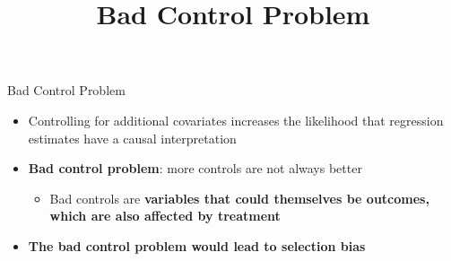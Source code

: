 \documentclass[dvipsnames,hyperref={pdfpagelabels=false}]{beamer}
\begin{document}
\title[]  
{Bad Control Problem}


\author 
{}

\institute{}






\date
{}


\begin{frame}{}
	\titlepage
\end{frame}









\begin{frame}{Bad Control Problem}
	\begin{itemize} 
		\item Controlling for additional covariates increases the likelihood that regression estimates have a causal interpretation
		\vspace{0.2cm}
		\item \textbf{Bad control problem}: more controls are not always better
		\begin{itemize} 
			\vspace{0.2cm}
			\item Bad controls are \textbf{variables that could themselves be outcomes, which are also affected by treatment}
			\vspace{0.2cm}
		\end{itemize}
		
		\item \textbf{The bad control problem would lead to selection bias}
	\end{itemize}
\end{frame}
\end{document}
